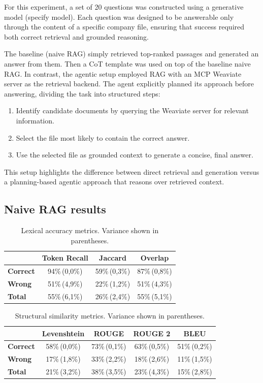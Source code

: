 For this experiment, a set of 20 questions was constructed using a generative model (specify model). Each question was designed to be answerable only through the content of a specific company file, ensuring that success required both correct retrieval and grounded reasoning.  

The baseline (naive RAG) simply retrieved top-ranked passages and generated an answer from them.
Then a CoT template was used on top of the baseline naive RAG.
In contrast, the agentic setup employed RAG with an MCP Weaviate server as the retrieval backend. The agent explicitly planned its approach before answering, dividing the task into structured steps:  
\begin{enumerate}
  \item Identify candidate documents by querying the Weaviate server for relevant information.  
  \item Select the file most likely to contain the correct answer.  
  \item Use the selected file as grounded context to generate a concise, final answer.  
\end{enumerate}

This setup highlights the difference between direct retrieval and generation versus a planning-based agentic approach that reasons over retrieved context.
\subsection{Naive RAG results}
\begin{table}[h]
\centering
\begin{tabular}{lccc}
\hline
 & Token Recall & Jaccard & Overlap \\
\hline
\textbf{Correct} & 94\%\,(0,0\%) & 59\%\,(0,3\%) & 87\%\,(0,8\%) \\
\textbf{Wrong}   & 51\%\,(4,9\%) & 22\%\,(1,2\%) & 51\%\,(4,3\%) \\
\textbf{Total}   & 55\%\,(6,1\%) & 26\%\,(2,4\%) & 55\%\,(5,1\%) \\
\hline
\end{tabular}
\caption{Lexical accuracy metrics. Variance shown in parentheses.}
\end{table}


\begin{table}[h]
\centering
\begin{tabular}{lcccc}
\hline
 & Levenshtein & ROUGE & ROUGE 2 & BLEU \\
\hline
\textbf{Correct} & 58\%\,(0,0\%) & 73\%\,(0,1\%) & 63\%\,(0,5\%) & 51\%\,(0,2\%) \\
\textbf{Wrong}   & 17\%\,(1,8\%) & 33\%\,(2,2\%) & 18\%\,(2,6\%) & 11\%\,(1,5\%) \\
\textbf{Total}   & 21\%\,(3,2\%) & 38\%\,(3,5\%) & 23\%\,(4,3\%) & 15\%\,(2,8\%) \\
\hline
\end{tabular}
\caption{Structural similarity metrics. Variance shown in parentheses.}
\end{table}

